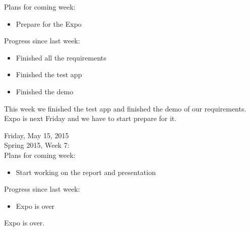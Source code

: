 Plans for coming week:
\begin{itemize}
\item Prepare for the Expo
\end{itemize}

Progress since last week:
\begin{itemize}
\item Finished all the requirements
\item Finished the test app
\item Finished the demo
\end{itemize}

This week we finished the test app and finished the demo of our requirements. Expo is next Friday and we have to start prepare for it.

Friday, May 15, 2015 \\
Spring 2015, Week 7: \\

Plans for coming week:
\begin{itemize}
\item Start working on the report and presentation
\end{itemize}

Progress since last week:
\begin{itemize}
\item Expo is over
\end{itemize}

Expo is over. 

